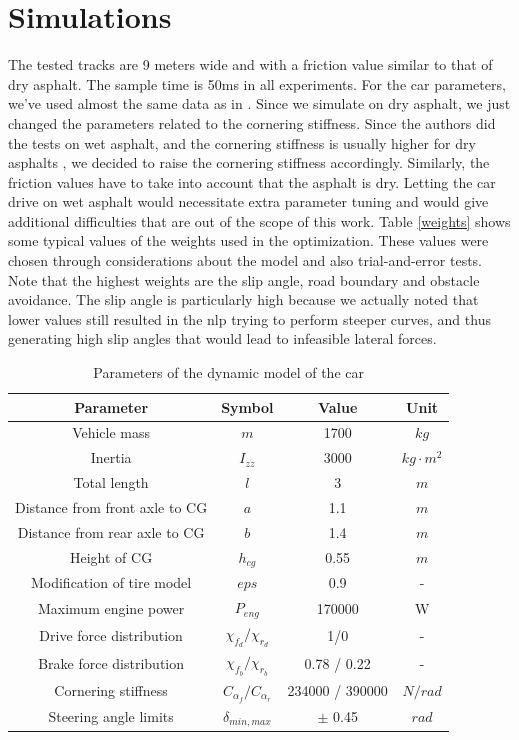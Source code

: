 \documentclass[a4paper, onecolumn, 11pt]{article}
\begin{document}
\section{Simulations}
The tested tracks are 9 meters wide and with a friction value similar to that of
dry asphalt. The sample time is 50ms in all experiments. For the car parameters,
we've used almost the same data as in \cite{paper}. Since we simulate on dry
asphalt, we just changed the parameters related to the cornering stiffness.
Since the authors did the tests on wet asphalt, and the cornering stiffness is
usually higher for dry asphalts \cite{stiffness}, we decided to raise the
cornering stiffness accordingly. Similarly, the friction values have to take
into account that the asphalt is dry. Letting the car drive on wet asphalt would
necessitate extra parameter tuning and would give additional difficulties that
are out of the scope of this work. Table \ref{weights} shows some typical values
of the weights used in the optimization. These values were chosen through
considerations about the model and also trial-and-error tests. Note that the
highest weights are the slip angle, road boundary and obstacle avoidance. The
slip angle is particularly high because we actually noted that lower values
still resulted in the nlp trying to perform steeper curves, and thus generating
high slip angles that would lead to infeasible lateral forces. 
\begin{table}[H]
    \centering
    \caption{Parameters of the dynamic model of the car} \label{params}
    \begin{tabular}{ |c|c|c|c| }
        \hline
        \textbf{Parameter} & \textbf{Symbol} & \textbf{Value} & \textbf{Unit} \\ [0.5ex] 
        \hline
        \hline 
        Vehicle mass & $m$ & 1700 & $kg$\\ 
        \hline
        Inertia & $I_{zz}$ & 3000 & $kg \cdot m^2$\\
        \hline
        Total length & $l$ & 3 & $m$\\
        \hline
        Distance from front axle to CG & $a$ & 1.1 & $m$\\
        \hline
        Distance from rear axle to CG & $b$ & 1.4 & $m$\\
        \hline
        Height of CG & $h_{cg}$ & 0.55 & $m$\\
        \hline
        Modification of tire model & $eps$ & 0.9 & -\\
        \hline
        Maximum engine power & $P_{eng}$ & 170000 & W \\
        \hline
        Drive force distribution & $\chi_{f_d} / \chi_{r_d}$ & 1/0 & -\\
        \hline
        Brake force distribution & $\chi_{f_b} / \chi_{r_b}$ & 0.78 / 0.22 & -\\
        \hline
        Cornering stiffness & $C_{\alpha_f} / C_{\alpha_r}$ & 234000 / 390000 & $N/rad$\\
        \hline
        Steering angle limits & $\delta_{min,max}$ & $\pm$ 0.45 & $rad$ \\
        \hline

    \end{tabular}
\end{table}
\end{document}
